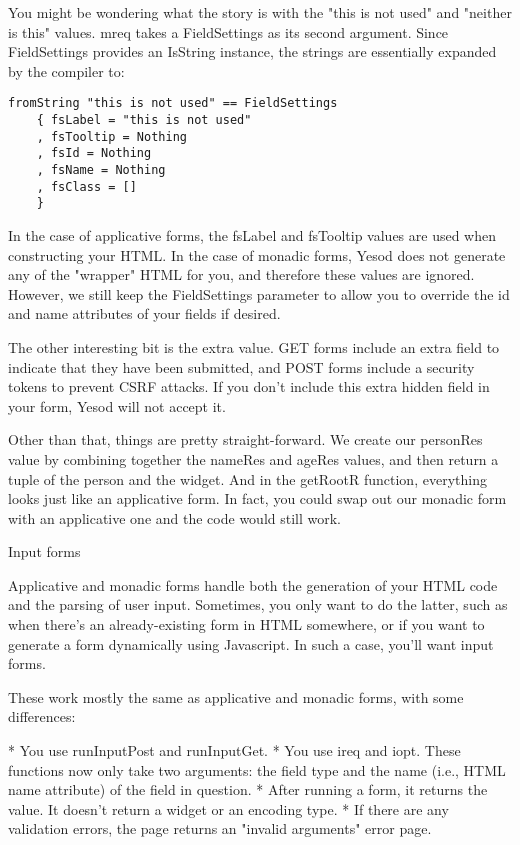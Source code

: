You might be wondering what the story is with the "this is not used" and "neither is this" values. mreq takes a FieldSettings as its second argument. Since FieldSettings provides an IsString instance, the strings are essentially expanded by the compiler to:

\begin{lstlisting}
fromString "this is not used" == FieldSettings
    { fsLabel = "this is not used"
    , fsTooltip = Nothing
    , fsId = Nothing
    , fsName = Nothing
    , fsClass = []
    }
\end{lstlisting}

In the case of applicative forms, the fsLabel and fsTooltip values are used when constructing your HTML. In the case of monadic forms, Yesod does not generate any of the "wrapper" HTML for you, and therefore these values are ignored. However, we still keep the FieldSettings parameter to allow you to override the id and name attributes of your fields if desired.

The other interesting bit is the extra value. GET forms include an extra field to indicate that they have been submitted, and POST forms include a security tokens to prevent CSRF attacks. If you don't include this extra hidden field in your form, Yesod will not accept it.

Other than that, things are pretty straight-forward. We create our personRes value by combining together the nameRes and ageRes values, and then return a tuple of the person and the widget. And in the getRootR function, everything looks just like an applicative form. In fact, you could swap out our monadic form with an applicative one and the code would still work.

Input forms

Applicative and monadic forms handle both the generation of your HTML code and the parsing of user input. Sometimes, you only want to do the latter, such as when there's an already-existing form in HTML somewhere, or if you want to generate a form dynamically using Javascript. In such a case, you'll want input forms.

These work mostly the same as applicative and monadic forms, with some differences:

* You use runInputPost and runInputGet.
* You use ireq and iopt. These functions now only take two arguments: the field type and the name (i.e., HTML name attribute) of the field in question.
* After running a form, it returns the value. It doesn't return a widget or an encoding type.
* If there are any validation errors, the page returns an "invalid arguments" error page.

